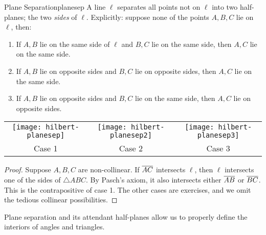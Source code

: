 \begin{thm}{Plane Separation}{planesep}
	A line $\ell$ separates all points not on $\ell$ into two half-planes; the two \emph{sides} of $\ell$. Explicitly: suppose none of the points $A,B,C$ lie on $\ell$, then:
	\begin{enumerate}\itemsep0pt
	  \item If $A,B$ lie on the same side of $\ell$ and $B,C$ lie on the same side, then $A,C$ lie on the same side.
	  \item If $A,B$ lie on opposite sides and $B,C$ lie on opposite sides, then $A,C$ lie on the same side.
	  \item If $A,B$ lie on opposite sides and $B,C$ lie on the same side, then $A,C$ lie on opposite sides.
	\end{enumerate}\vspace{-10pt}
	\begin{center}
		\begin{tabular}{c@{\qquad}c@{\qquad}c}
			\texttt{[image: hilbert-planesep]}
			&
			\texttt{[image: hilbert-planesep2]}
			&
			\texttt{[image: hilbert-planesep3]}
			\\
			Case 1
			&
			Case 2
			&
			Case 3
		\end{tabular}
	\end{center}
\end{thm}

\begin{proof}
Suppose $A,B,C$ are non-collinear. If $\overline{AC}$ intersects $\ell$, then $\ell$ intersects one of the sides of $\triangle ABC$. By Pasch's axiom, it also intersects either $\overline{AB}$ or $\overline{BC}$. This is the contrapositive of case 1.\smallbreak
The other cases are exercises, and we omit the tedious collinear possibilities.
\end{proof}

Plane separation and its attendant half-planes allow us to properly define the interiors of angles and triangles. 

